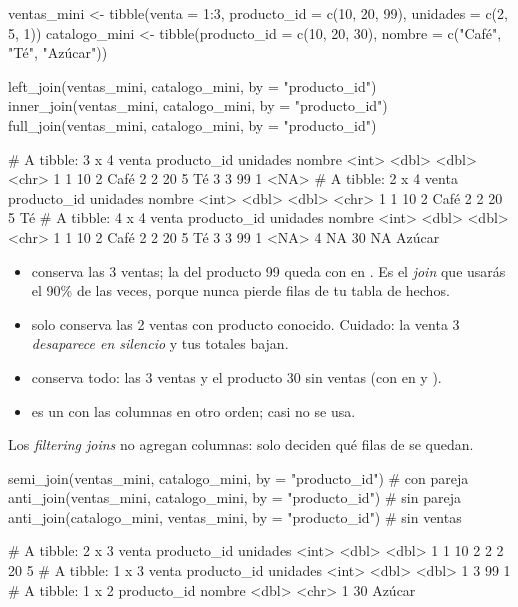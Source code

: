 \begin{rcode}
ventas_mini <- tibble(venta = 1:3, producto_id = c(10, 20, 99),
                      unidades = c(2, 5, 1))
catalogo_mini <- tibble(producto_id = c(10, 20, 30),
                        nombre = c("Café", "Té", "Azúcar"))

left_join(ventas_mini, catalogo_mini, by = "producto_id")
inner_join(ventas_mini, catalogo_mini, by = "producto_id")
full_join(ventas_mini, catalogo_mini, by = "producto_id")
\end{rcode}
\begin{rsalida}
# A tibble: 3 x 4
  venta producto_id unidades nombre
  <int>       <dbl>    <dbl> <chr> 
1     1          10        2 Café  
2     2          20        5 Té    
3     3          99        1 <NA>  
# A tibble: 2 x 4
  venta producto_id unidades nombre
  <int>       <dbl>    <dbl> <chr> 
1     1          10        2 Café  
2     2          20        5 Té    
# A tibble: 4 x 4
  venta producto_id unidades nombre
  <int>       <dbl>    <dbl> <chr> 
1     1          10        2 Café  
2     2          20        5 Té    
3     3          99        1 <NA>  
4    NA          30       NA Azúcar
\end{rsalida}

\begin{itemize}
  \item {} conserva las 3 ventas; la del producto 99 queda
        con  en . Es el \emph{join} que usarás el
        90\% de las veces, porque nunca pierde filas de tu tabla de hechos.
  \item {} solo conserva las 2 ventas con producto
        conocido. Cuidado: la venta 3 \emph{desaparece en silencio} y tus
        totales bajan.
  \item {} conserva todo: las 3 ventas y el producto 30
        sin ventas (con  en  y ).
  \item {} es un  con las
        columnas en otro orden; casi no se usa.
\end{itemize}

Los \emph{filtering joins} no agregan columnas: solo deciden qué filas de
 se quedan.

\begin{rcode}
semi_join(ventas_mini, catalogo_mini, by = "producto_id") # con pareja
anti_join(ventas_mini, catalogo_mini, by = "producto_id") # sin pareja
anti_join(catalogo_mini, ventas_mini, by = "producto_id") # sin ventas
\end{rcode}
\begin{rsalida}
# A tibble: 2 x 3
  venta producto_id unidades
  <int>       <dbl>    <dbl>
1     1          10        2
2     2          20        5
# A tibble: 1 x 3
  venta producto_id unidades
  <int>       <dbl>    <dbl>
1     3          99        1
# A tibble: 1 x 2
  producto_id nombre
        <dbl> <chr> 
1          30 Azúcar
\end{rsalida}

